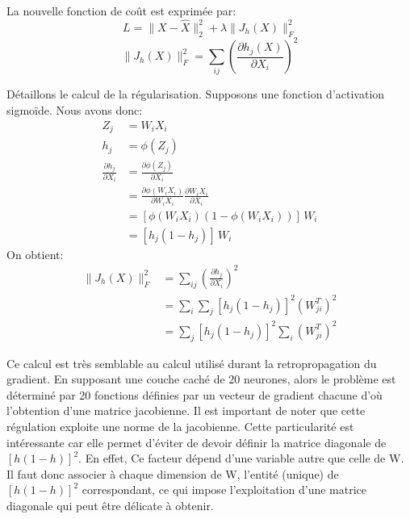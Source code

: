\noindent La nouvelle fonction de coût est exprimée par:
$$L = \lVert X - \hat{X} \rVert_2^2  + \lambda \lVert J_h(X) \rVert_F^2 $$
$$\lVert J_h(X) \rVert_F^2 = \sum_{ij} \left( \frac{\partial h_j(X)}{\partial X_i} \right)^2$$

\noindent Détaillons le calcul de la régularisation. Supposons une fonction d'activation sigmoïde. Nous avons donc:
\begin{align}
Z_j & = W_i X_i \\[10pt]
h_j & = \phi(Z_j)\\[10pt]
\frac{\partial h_j}{\partial X_i} &= \frac{\partial \phi(Z_j)}{\partial X_i} \\[10pt]
                                 &= \frac{\partial \phi(W_i X_i)}{\partial W_i X_i} \frac{\partial W_i X_i}{\partial X_i} \\[10pt]
                                 &= [\phi(W_i X_i)(1 - \phi(W_i X_i))] \, W_{i} \\[10pt]
                                 &= [h_j(1 - h_j)] \, W_i
\end{align}
On obtient:
\begin{align}
\lVert J_h(X) \rVert_F^2 &= \sum_{ij} \left( \frac{\partial h_j}{\partial X_i} \right)^2 \\[10pt]
                         &= \sum_i \sum_j [h_j(1 - h_j)]^2 (W_{ji}^T)^2 \\[10pt]
                         &= \sum_j [h_j(1 - h_j)]^2 \sum_i (W_{ji}^T)^2
\end{align}

\noindent Ce calcul est très semblable au calcul utilisé durant la retropropagation du gradient. En supposant une couche caché de 20 neurones, alors le problème est déterminé par 20 fonctions définies par un vecteur de gradient chacune d'où l'obtention d'une matrice jacobienne. Il est important de noter que cette régulation exploite une norme de la jacobienne. Cette particularité est intéressante car elle permet d'éviter de devoir définir la matrice diagonale de $[h(1 - h)]^2$. En effet, Ce facteur dépend d'une variable autre que celle de W. Il faut donc associer à chaque dimension de W, l'entité (unique) de $[h(1 - h)]^2$ correspondant, ce qui impose l'exploitation d'une matrice diagonale qui peut être délicate à obtenir.\\

